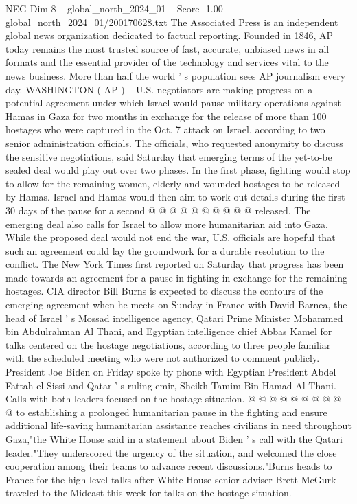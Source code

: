 \begin{textsample}{NEG Dim 8 – global\_north\_2024\_01 – Score -1.00 – global\_north\_2024\_01/200170628.txt}  \label{ex:f8_neg_208}
The Associated Press is an independent global news organization dedicated to factual reporting.
Founded in 1846, AP today remains the most trusted source of fast, accurate, unbiased news in all formats and the essential provider of the technology and services vital to the news business.
More than half the world ' s population sees AP journalism every day.
WASHINGTON ( AP ) -- U.S. negotiators are making progress on a potential agreement under which Israel would pause military operations against Hamas in Gaza for two months in exchange for the release of more than 100 hostages who were captured in the Oct. 7 attack on Israel, according to two senior administration officials.
The officials, who requested anonymity to discuss the sensitive negotiations, said Saturday that emerging terms of the yet-to-be sealed deal would play out over two phases.
In the first phase, fighting would stop to allow for the remaining women, elderly and wounded hostages to be released by Hamas.
Israel and Hamas would then aim to work out details during the first 30 days of the pause for a second @ @ @ @ @ @ @ @ @ @ released.
The emerging deal also calls for Israel to allow more humanitarian aid into Gaza.
While the proposed deal would not end the war, U.S. officials are hopeful that such an agreement could lay the groundwork for a durable resolution to the conflict.
The New York Times first reported on Saturday that progress has been made towards an agreement for a pause in fighting in exchange for the remaining hostages.
CIA director Bill Burns is expected to discuss the contours of the emerging agreement when he meets on Sunday in France with David Barnea, the head of Israel ' s Mossad intelligence agency, Qatari Prime Minister Mohammed bin Abdulrahman Al Thani, and Egyptian intelligence chief Abbas Kamel for talks centered on the hostage negotiations, according to three people familiar with the scheduled meeting who were not authorized to comment publicly.
President Joe Biden on Friday spoke by phone with Egyptian President Abdel Fattah el-Sissi and Qatar ' s ruling emir, Sheikh Tamim Bin Hamad Al-Thani.
Calls with both leaders focused on the hostage situation. @ @ @ @ @ @ @ @ @ @ to establishing a prolonged humanitarian pause in the fighting and ensure additional life-saving humanitarian assistance reaches civilians in need throughout Gaza,"the White House said in a statement about Biden ' s call with the Qatari leader."They underscored the urgency of the situation, and welcomed the close cooperation among their teams to advance recent discussions."Burns heads to France for the high-level talks after White House senior adviser Brett McGurk traveled to the Mideast this week for talks on the hostage situation.

\end{textsample}
